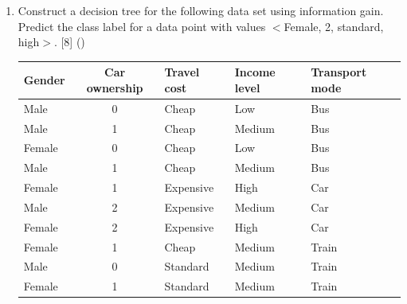 \documentclass[12pt]{article}
\begin{document}
\begin{enumerate}[topsep=0pt, noitemsep]
      \item Construct a decision tree for the following data set using information gain. Predict the class label for a data point with values $<$Female, 2, standard, high$>$. \hfill [8] ()\\
        \small
        \begin{tabular}{|l|c|l|l|l|}
          \hline
          Gender & Car ownership & Travel cost & Income level & Transport mode \\ \hline
          Male & 0 & Cheap & Low & Bus \\ \hline
          Male & 1 & Cheap & Medium & Bus \\ \hline
          Female & 0 & Cheap & Low & Bus \\ \hline
          Male & 1 & Cheap & Medium & Bus \\ \hline
          Female & 1 & Expensive & High & Car \\ \hline
          Male & 2 & Expensive & Medium & Car \\ \hline
          Female & 2 & Expensive & High & Car \\ \hline
          Female & 1 & Cheap & Medium & Train \\ \hline
          Male & 0 & Standard & Medium & Train \\ \hline
          Female & 1 & Standard & Medium & Train \\ \hline
        \end{tabular}
        \normalsize


\end{enumerate}
\end{document}
